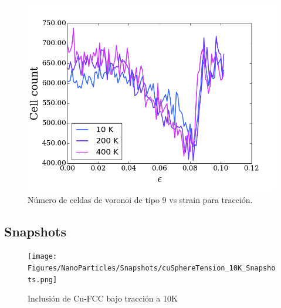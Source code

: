 \documentclass[10pt, oneside]{article} %
\begin{document}
\begin{figure}[H]
\centering
\includegraphics[width=15cm]{Figures/NanoParticles/voro_type9_tension.png}
\caption{Número de celdas de voronoi de tipo 9 vs strain para tracción.}
\end{figure}

\subsection{Snapshots}

\begin{figure}[H]
\centering
\texttt{[image: Figures/NanoParticles/Snapshots/cuSphereTension\_10K\_Snapshots.png]}
\caption{Inclusión de Cu-FCC bajo tracción a 10K}
\end{figure}
\end{document}

